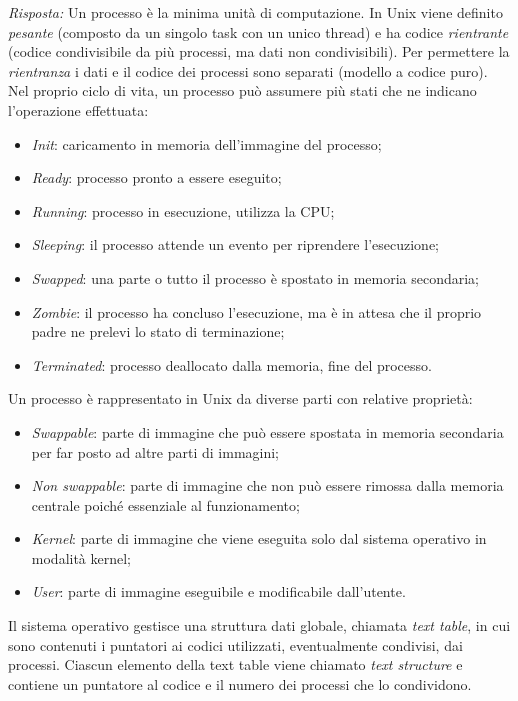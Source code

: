 \documentclass{article}
\newenvironment{solution}
    {\textit{Risposta:}}
    {}
\begin{document}
\begin{solution}
Un processo è la minima unità di computazione.
\newline
In Unix viene definito \textit{pesante} (composto da un singolo task con un unico thread) e ha codice \textit{rientrante} (codice condivisibile da più processi, ma dati non condivisibili).
Per permettere la \textit{rientranza} i dati e il codice dei processi sono separati (modello a codice puro).
\newline
Nel proprio ciclo di vita, un processo può assumere più stati che ne indicano l’operazione effettuata: 
\begin{itemize}
    \item \emph{Init}: caricamento in memoria dell’immagine del processo;
    \item \emph{Ready}: processo pronto a essere eseguito;
    \item \emph{Running}: processo in esecuzione, utilizza la CPU;
    \item \emph{Sleeping}: il processo attende un evento per riprendere l’esecuzione; 
    \item \emph{Swapped}: una parte o tutto il processo è spostato in memoria secondaria;
    \item \emph{Zombie}: il processo ha concluso l'esecuzione, ma è in attesa che il proprio padre ne prelevi lo stato di terminazione;
    \item \emph{Terminated}: processo deallocato dalla memoria, fine del processo.
\end{itemize}
Un processo è rappresentato in Unix da diverse parti con relative proprietà:
\begin{itemize}
    \item \emph{Swappable}: parte di immagine che può essere spostata in memoria secondaria per far posto ad altre parti di immagini;
    \item \emph{Non swappable}: parte di immagine che non può essere rimossa dalla memoria centrale poiché essenziale al funzionamento; 
    \item \emph{Kernel}: parte di immagine che viene eseguita solo dal sistema operativo in modalità kernel;
    \item \emph{User}: parte di immagine eseguibile e modificabile dall’utente.
\end{itemize}
Il sistema operativo gestisce una struttura dati globale, chiamata \textit{text table}, in cui sono contenuti i puntatori ai codici utilizzati, eventualmente condivisi, dai processi. 
Ciascun elemento della text table viene chiamato \textit{text structure} e contiene un puntatore al codice e il numero dei processi che lo condividono.

\end{solution}
\end{document}
